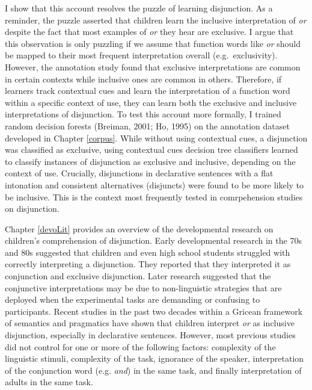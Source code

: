 \documentclass[oneside]{report}
\theoremstyle{definition}
\theoremstyle{definition}
\theoremstyle{definition}
\theoremstyle{remark}
\begin{document}
I show that this account resolves the puzzle of learning disjunction. As
a reminder, the puzzle asserted that children learn the inclusive
interpretation of \emph{or} despite the fact that most examples of
\emph{or} they hear are exclusive. I argue that this observation is only
puzzling if we assume that function words like \emph{or} should be
mapped to their most frequent interpretation overall (e.g.~exclusivity).
However, the annotation study found that exclusive interpretations are
common in certain contexts while inclusive ones are common in others.
Therefore, if learners track contextual cues and learn the
interpretation of a function word within a specific context of use, they
can learn both the exclusive and inclusive interpretations of
disjunction. To test this account more formally, I trained random
decision forests (Breiman, 2001; Ho, 1995) on the annotation dataset
developed in Chapter \ref{corpus}. While without using contextual cues,
a disjunction was classified as exclusive, using contextual cues
decision tree classifiers learned to classify instances of disjunction
as exclusive and inclusive, depending on the context of use. Crucially,
disjunctions in declarative sentences with a flat intonation and
consistent alternatives (disjuncts) were found to be more likely to be
inclusive. This is the context most frequently tested in comrpehension
studies on disjunction.

Chapter \ref{devoLit} provides an overview of the developmental research
on children's comprehension of disjunction. Early developmental research
in the 70s and 80s suggested that children and even high school students
struggled with correctly interpreting a disjunction. They reported that
they interpreted it as conjunction and exclusive disjunction. Later
research suggested that the conjunctive interpretations may be due to
non-linguistic strategies that are deployed when the experimental tasks
are demanding or confusing to participants. Recent studies in the past
two decades within a Gricean framework of semantics and pragmatics have
shown that children interpret \emph{or} as inclusive disjunction,
especially in declarative sentences. However, most previous studies did
not control for one or more of the following factors: complexity of the
linguistic stimuli, complexity of the task, ignorance of the speaker,
interpretation of the conjunction word (e.g. \emph{and}) in the same
task, and finally interpretation of adults in the same task.
\end{document}
